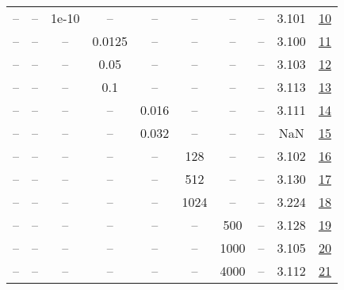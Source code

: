 \begin{table}[H]
\begin{tabular}{cccccccccc}
-- & -- & 1e-10 & -- & -- & -- & -- & -- & 3.101 & \href{https://wandb.ai/stanford-mercury/optimizer-scaling/runs/sweep-520m-10B-marsa92a9dlr0.008-wd0.1-minlr0-warmup2000-b10.95--391f57}{10} \\
-- & -- & -- & 0.0125 & -- & -- & -- & -- & 3.100 & \href{https://wandb.ai/stanford-mercury/optimizer-scaling/runs/sweep-520m-10B-marsb386c8lr0.008-wd0.1-minlr0-warmup2000-b10.95--e1ca32}{11} \\
-- & -- & -- & 0.05 & -- & -- & -- & -- & 3.103 & \href{https://wandb.ai/stanford-mercury/optimizer-scaling/runs/sweep-520m-10B-marse74b34lr0.008-wd0.1-minlr0-warmup2000-b10.95--902394}{12} \\
-- & -- & -- & 0.1 & -- & -- & -- & -- & 3.113 & \href{https://wandb.ai/stanford-mercury/optimizer-scaling/runs/sweep-520m-10B-marst656743lr0.008-wd0.1-minlr0-warmup2000-b10.95-796b89}{13} \\
-- & -- & -- & -- & 0.016 & -- & -- & -- & 3.111 & \href{https://wandb.ai/stanford-mercury/optimizer-scaling/runs/sweep-520m-10B-mars1ad142lr0.016-wd0.1-minlr0-warmup2000-b10.95--96fc22}{14} \\
-- & -- & -- & -- & 0.032 & -- & -- & -- & NaN & \href{https://wandb.ai/stanford-mercury/optimizer-scaling/runs/sweep-520m-10B-marsbb494clr0.032-wd0.1-minlr0-warmup2000-b10.95--4cb91d}{15} \\
-- & -- & -- & -- & -- & 128 & -- & -- & 3.102 & \href{https://wandb.ai/stanford-mercury/optimizer-scaling/runs/sweep-520m-10B-marsfbbfc9lr0.008-wd0.1-minlr0-warmup2000-b10.95--e8c9e5}{16} \\
-- & -- & -- & -- & -- & 512 & -- & -- & 3.130 & \href{https://wandb.ai/stanford-mercury/optimizer-scaling/runs/sweep-520m-10B-mars5bfa62lr0.008-wd0.1-minlr0-warmup2000-b10.95--b53901}{17} \\
-- & -- & -- & -- & -- & 1024 & -- & -- & 3.224 & \href{https://wandb.ai/stanford-mercury/optimizer-scaling/runs/sweep-520m-10B-mars3d3d86lr0.008-wd0.1-minlr0-warmup2000-b10.95--f8862b}{18} \\
-- & -- & -- & -- & -- & -- & 500 & -- & 3.128 & \href{https://wandb.ai/stanford-mercury/optimizer-scaling/runs/sweep-520m-10B-mars5e3138lr0.008-wd0.1-minlr0-warmup500-b10.95-b-d4539f}{19} \\
-- & -- & -- & -- & -- & -- & 1000 & -- & 3.105 & \href{https://wandb.ai/stanford-mercury/optimizer-scaling/runs/sweep-520m-10B-mars92cf12lr0.008-wd0.1-minlr0-warmup1000-b10.95--af09eb}{20} \\
-- & -- & -- & -- & -- & -- & 4000 & -- & 3.112 & \href{https://wandb.ai/stanford-mercury/optimizer-scaling/runs/sweep-520m-10B-mars77a9fflr0.008-wd0.1-minlr0-warmup4000-b10.95--986850}{21} \\

\end{tabular}
\end{table}
